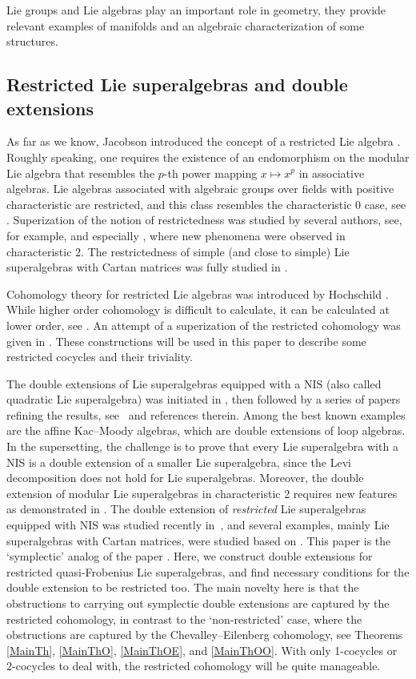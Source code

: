 \documentclass[10pt,a4paper]{amsart}
\numberwithin{equation}{section}
\begin{document}
Lie groups and Lie algebras play an important role in geometry, they provide relevant examples of manifolds and an algebraic characterization of some structures.

\subsection{Restricted Lie superalgebras and double extensions}
As far as we know, Jacobson introduced the concept of a restricted Lie algebra
\cite{J}. Roughly speaking, one requires the existence of an endomorphism on the modular
Lie algebra that resembles the $p$-th power mapping $x \mapsto x^p$ in associative algebras. Lie algebras associated with algebraic groups over fields with positive characteristic are restricted, and this class resembles the characteristic 0 case, see \cite{S, SF}. Superization
of the notion of restrictedness was studied by several authors, see, for example, \cite{BKLS, Fa, P,SZ, U,Y, YCC, Z} and especially \cite{BLLS}, where new phenomena were observed in characteristic 2. The restrictedness of simple (and close to simple) Lie superalgebras with Cartan matrices was fully studied in \cite{BKLLS}.

Cohomology theory for restricted Lie algebras was introduced by Hochschild \cite{H}. While higher order cohomology is difficult to calculate, it can be calculated at lower order, see \cite{EF}. An attempt of a superization of the restricted cohomology was given in \cite{YCC}. These constructions will be used in this paper to describe some restricted cocycles and their triviality.

The double extensions of Lie superalgebras equipped with a NIS (also called quadratic Lie superalgebra) was initiated in \cite{BB}, then followed by a series of papers refining the results, see~\cite{B} and references therein. Among the best known examples are the affine Kac--Moody algebras, which are double extensions of loop algebras. In the supersetting, the challenge is to prove that every Lie superalgebra with a NIS is a double extension of a smaller Lie superalgebra, since the Levi decomposition does not hold for Lie superalgebras. Moreover, the double extension of modular Lie superalgebras in characteristic 2 requires new features as demonstrated in \cite{BeBou1, BeBou2}. The double extension of {\it restricted} Lie superalgebras equipped with NIS was studied recently in~\cite{BBH}, and several examples, mainly Lie superalgebras with Cartan matrices, were studied based on \cite{BKLS, BKLLS}. This paper is the `symplectic' analog of the paper \cite{BBH}. Here, we construct double extensions for restricted quasi-Frobenius Lie superalgebras, and find necessary conditions for the double extension to be restricted too. The main novelty here is that the obstructions to carrying out symplectic double extensions are captured by the restricted cohomology, in contrast to the `non-restricted' case, where the obstructions are captured by the Chevalley--Eilenberg cohomology, see Theorems \ref{MainTh}, \ref{MainThO}, \ref{MainThOE}, and \ref{MainThOO}. With only 1-cocycles or 2-cocycles to deal with, the restricted cohomology will be quite manageable.
\end{document}
